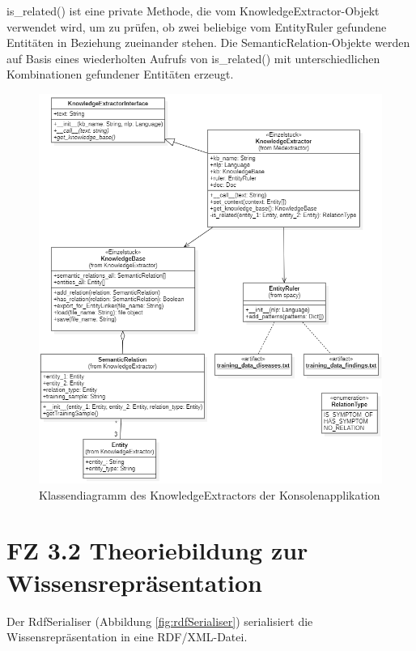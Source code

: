 is\_related() ist eine private Methode, die vom KnowledgeExtractor-Objekt verwendet wird, um zu prüfen, ob zwei beliebige vom EntityRuler gefundene Entitäten in Beziehung zueinander stehen. Die SemanticRelation-Objekte werden auf Basis eines wiederholten Aufrufs von is\_related() mit unterschiedlichen Kombinationen gefundener Entitäten erzeugt. 

\begin{figure}[h]
    \centering
    \includegraphics[width=\textwidth]{pictures/KnowledgeExtractor.png}
    \caption{Klassendiagramm des KnowledgeExtractors der Konsolenapplikation}
    \label{fig:KnowledgeExtractor}
\end{figure}

\section{FZ 3.2 Theoriebildung zur Wissensrepräsentation}
\label{sec:FZ3.2} 

Der RdfSerialiser (Abbildung \ref{fig:rdfSerialiser}) serialisiert die Wissensrepräsentation in eine RDF/XML-Datei.

